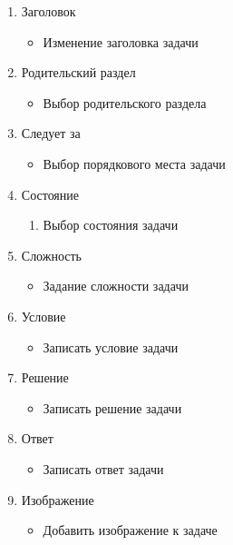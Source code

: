 \begin{enumerate}
\begin{enumerate}
\begin{enumerate}
            \item Заголовок
            \begin{itemize}
                \item Изменение заголовка задачи
            \end{itemize}

            \item Родительский раздел
            \begin{itemize}
                \item Выбор родительского раздела
            \end{itemize}

            \item Следует за
            \begin{itemize}
                \item Выбор порядкового места задачи
            \end{itemize}

            \item Состояние
            \begin{enumerate}
                \item Выбор состояния задачи
            \end{enumerate}

            \item Сложность
            \begin{itemize}
                \item Задание сложности задачи
            \end{itemize}

            \item Условие
            \begin{itemize}
                \item Записать условие задачи
            \end{itemize}

            \item Решение
            \begin{itemize}
                \item Записать решение задачи
            \end{itemize}

            \item Ответ
            \begin{itemize}
                \item Записать ответ задачи
            \end{itemize}

            \item Изображение
            \begin{itemize}
                \item Добавить изображение к задаче
            \end{itemize}

        \end{enumerate}
    \end{enumerate}
\end{enumerate}

